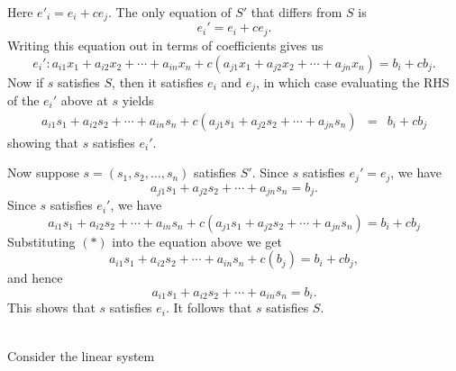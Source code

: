 \begin{solution}
\begin{description}
 Here $e'_i=e_i+ce_j$. The only equation of $S'$ that differs from $S$ is 
\[
e_i'=e_i+ce_j.
\]
Writing this equation out in terms of coefficients gives us
\[
e_i': a_{i1}x_1+a_{i2}x_2+\cdots +a_{in}x_n+c(a_{j1}x_1+a_{j2}x_2+\cdots +a_{jn}x_n)=b_i+cb_j.
\] 
Now if $s$ satisfies $S$, then it satisfies $e_i$ and $e_j$, in which case evaluating the RHS of the $e_i'$ above at $s$ yields 
\begin{eqnarray*}
a_{i1}s_1+a_{i2}s_2+\cdots +a_{in}s_n+c(a_{j1}s_1+a_{j2}s_2+\cdots +a_{jn}s_n)&=&b_i+cb_j
\end{eqnarray*}
showing that $s$ satisfies $e_i'$. 

Now suppose $s=(s_1,s_2,\dots, s_n)$ satisfies $S'$. Since $s$ satisfies $e_j'=e_j$, we have 
 \[
 a_{j1}s_1+a_{j2}s_2+\cdots +a_{jn}s_n=b_j\tag{$*$}.
 \]
Since $s$ satisfies $e_i'$, we have 
\[
a_{i1}s_1+a_{i2}s_2+\cdots +a_{in}s_n+c(a_{j1}s_1+a_{j2}s_2+\cdots +a_{jn}s_n)=b_i+cb_j
\]
Substituting $(*)$ into the equation above we get 
\[
a_{i1}s_1+a_{i2}s_2+\cdots +a_{in}s_n+c(b_j)=b_i+cb_j,
\]
and hence 
\[
a_{i1}s_1+a_{i2}s_2+\cdots +a_{in}s_n=b_i.
\]
This shows that $s$ satisfies $e_i$. It follows that $s$ satisfies $S$.

\end{description}
\end{solution}
\ \\
\ii
\noindent
Consider the linear system
